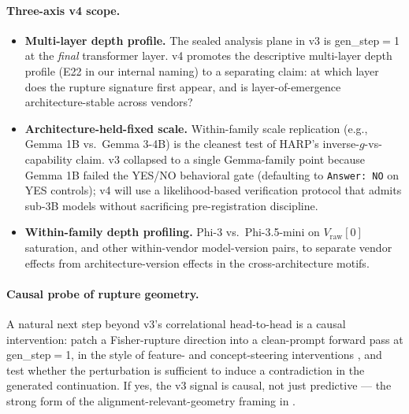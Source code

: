 \documentclass[10pt, letterpaper]{article}
\begin{document}
\paragraph{Three-axis v4 scope.}
\begin{itemize}[leftmargin=*, itemsep=2pt, topsep=2pt]
  \item \textbf{Multi-layer depth profile.} The sealed analysis plane
  in v3 is gen\_step$=$1 at the \emph{final} transformer layer. v4
  promotes the descriptive multi-layer depth profile (E22 in our
  internal naming) to a separating claim: at which layer does the
  rupture signature first appear, and is layer-of-emergence
  architecture-stable across vendors?
  \item \textbf{Architecture-held-fixed scale.} Within-family scale
  replication (e.g., Gemma 1B vs.\ Gemma 3-4B) is the cleanest test
  of HARP's inverse-$g$-vs-capability claim. v3 collapsed to a single
  Gemma-family point because Gemma 1B failed the YES/NO behavioral
  gate (defaulting to \texttt{Answer: NO} on YES controls); v4 will
  use a likelihood-based verification protocol that admits sub-3B
  models without sacrificing pre-registration discipline.
  \item \textbf{Within-family depth profiling.} Phi-3 vs.\
  Phi-3.5-mini on $V_\text{raw}[0]$ saturation, and other
  within-vendor model-version pairs, to separate vendor effects from
  architecture-version effects in the cross-architecture motifs.
\end{itemize}

\paragraph{Causal probe of rupture geometry.}
A natural next step beyond v3's correlational head-to-head is a
causal intervention: patch a Fisher-rupture direction into a
clean-prompt forward pass at gen\_step$=$1, in the style of
feature- and concept-steering interventions
\citep{sofroniew2026emotions}, and test whether the perturbation is
sufficient to induce a contradiction in the generated continuation.
If yes, the v3 signal is causal, not just predictive --- the strong
form of the alignment-relevant-geometry framing in
.
\end{document}

